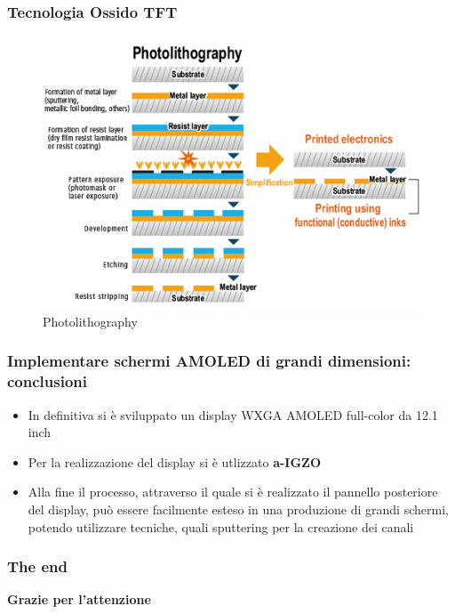 \documentclass[12pt]{beamer}
\begin{document}
	\begin{frame}
		\frametitle{Tecnologia Ossido TFT}
		\begin{figure}
			\centering
			\includegraphics[width=0.9\linewidth]{IMMAGINI/photolitography}
			\caption{Photolithography}
			\label{fig:photolitography}
		\end{figure}
	\end{frame}	
	\begin{frame}
		\frametitle{Implementare schermi AMOLED di grandi dimensioni: conclusioni}
		\begin{itemize}
			\item In definitiva si è sviluppato un display WXGA AMOLED full-color da 12.1 inch
			\pause
			\item Per la realizzazione del display si è utlizzato \textbf{a-IGZO}
			\pause
			\item Alla fine il processo, attraverso il quale si è realizzato il pannello posteriore del display, può essere facilmente esteso in una produzione di grandi schermi, potendo utilizzare tecniche, quali sputtering per la creazione dei canali 
		\end{itemize}
	\end{frame}
	\begin{frame}
		\frametitle{The end}
			\textbf{Grazie per l'attenzione}
	\end{frame}
\end{document}
